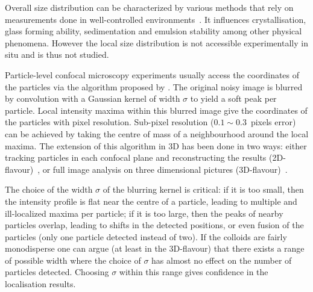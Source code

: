 \documentclass[8.5pt,twoside,twocolumn]{article}
\begin{document}
Overall size distribution can be characterized by various methods that rely on measurements done in well-controlled environments~\cite{Lange1995,Provder1997,Finder2004}. It influences crystallisation, glass forming ability, sedimentation and emulsion stability among other physical phenomena. However the local size distribution is not accessible experimentally in situ and is thus not studied.

Particle-level confocal microscopy experiments usually access the coordinates of the particles via the algorithm proposed by \citet{Crocker1996}. The original noisy image is blurred by convolution with a Gaussian kernel of width $\sigma$ to yield a soft peak per particle. Local intensity maxima within this blurred image give the coordinates of the particles with pixel resolution. Sub-pixel resolution ($0.1\sim0.3$~pixels error) can be achieved by taking the centre of mass of a neighbourhood around the local maxima. The extension of this algorithm in 3D has been done in two ways: either tracking particles in each confocal plane and reconstructing the results (2D-flavour)~\citep{dinsmore2001tdc}, or full image analysis on three dimensional pictures (3D-flavour)~\citep{vanblaaderen1995rss, Lu2007}.

The choice of the width $\sigma$ of the blurring kernel is critical: if it is too small, then the intensity profile is flat near the centre  of a particle, leading to multiple and ill-localized maxima per particle; if it is too large, then the peaks of nearby particles overlap, leading to shifts in the detected positions, or even fusion of the particles (only one particle detected instead of two). If the colloids are fairly monodisperse one can argue (at least in the 3D-flavour) that there exists a range of possible width where the choice of $\sigma$ has almost no effect on the number of particles detected. Choosing $\sigma$ within this range gives confidence in the localisation results.
\end{document}
